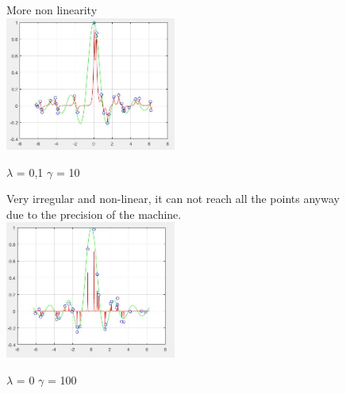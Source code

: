 \begin{figure}
More non linearity\\

	
	\includegraphics[width=0.5\textwidth]{kml10g01.png}
	\centering
	\caption{$\lambda$ = 0,1 $\gamma$ = 10}
\end{figure}

\begin{figure}
	
Very irregular and non-linear, it can not reach all the points anyway due to the precision of the machine.\\

	
	\includegraphics[width=0.5\textwidth]{kml100g0.png}
	\centering
	\caption{$\lambda$ = 0 $\gamma$ = 100}
\end{figure}


